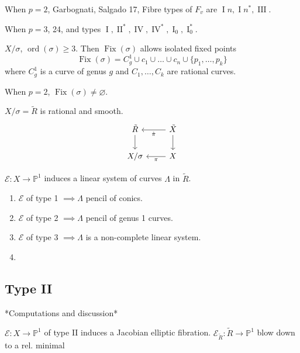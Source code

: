 When $p=2$, Garbognati, Salgado 17, Fibre types of  $F_v$ are $\operatorname{I}n,\operatorname{I}n^* ,\operatorname{I I I}$.

When $p=3$, 24, and types $\operatorname{I},\operatorname{I I}^* ,\operatorname{IV},\operatorname{IV}^* ,\operatorname{I}_{0},\operatorname{I}_{0}^*$.

$X/\sigma$, $\operatorname{ord}(\sigma)\geq 3$. Then $\operatorname{Fix}(\sigma)$ allows isolated fixed points
\[\operatorname{Fix}(\sigma)=C^1_g \cup c_1\cup \ldots \cup c_n\cup \{p_1,\ldots,p_k\}\]
where $C^1_g$ is a curve of genus $g$ and $C_1,\ldots,C_k$ are rational curves.

When $p=2$, $\operatorname{Fix}(\sigma)\neq \varnothing$.

$X/\sigma=\tilde{R}$ is rational and smooth.
\[\begin{tikzcd}
	\tilde{R}\arrow[d]&\tilde{X}\arrow[l,"\hat{\pi}"]\arrow[d]\\
	X/\sigma & X\arrow[l,"\pi"]
\end{tikzcd}\]

$ \mathcal{E}:X\to \mathbb{P}^1$ induces a linear system of curves $\Lambda$ in $\tilde{R}$.

\begin{enumerate}
	\item  $\mathcal{E}$ of type 1 $\implies \Lambda$ pencil of conics.
	\item $\mathcal{E}$ of type 2 $\implies \Lambda$ pencil of genus 1 curves.
	\item $\mathcal{E}$ of type 3 $\implies \Lambda$ is a non-complete linear system.

	\item 
\end{enumerate}

\subsection{Type II}

*Computations and discussion*

$\mathcal{E}:X\to \mathbb{P}^1$ of type  II induces a Jacobian elliptic fibration. $\mathcal{E}_{\tilde{R}}:\tilde{R}\to \mathbb{P}^1$ blow down to a rel. minimal



